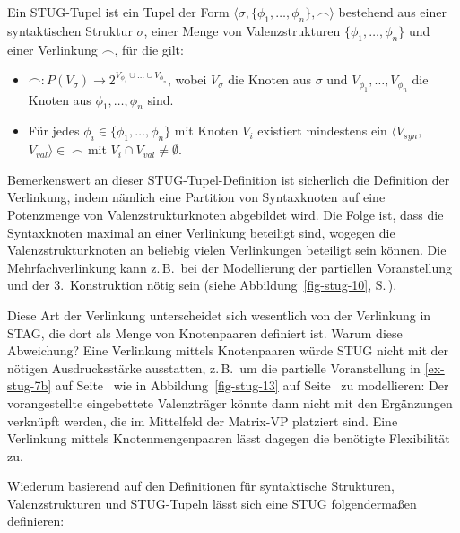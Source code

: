 \begin{definition}
Ein STUG-Tupel ist ein Tupel der Form $\langle \sigma,\{\phi_1,$\linebreak $\ldots,\phi_n\}, \frown\rangle$ bestehend aus einer syntaktischen Struktur $\sigma$, einer Menge von Valenzstrukturen $\{\phi_1,\ldots,\phi_n\}$ und einer Verlinkung $\frown$, für die gilt:
\begin{itemize}
  \item $\frown: P(V_\sigma) \to 2^{V_{\phi_1} \cup \ldots \cup V_{\phi_n}}$, wobei $V_\sigma$ die Knoten aus $\sigma$ und $V_{\phi_1}, \ldots, V_{\phi_n}$ die Knoten aus $\phi_1,\ldots,\phi_n$ sind.
  \item Für jedes $\phi_i \in \{\phi_1,\ldots,\phi_n\}$ mit Knoten $V_i$ existiert mindestens ein $\langle V_{syn},$ $V_{val}\rangle \in \ \frown$ mit $V_i \cap V_{val} \ne \emptyset$.
\end{itemize}
\end{definition}
Bemerkenswert an dieser STUG-Tupel-Definition ist sicherlich die Definition der Verlinkung, indem nämlich eine Partition von Syntaxknoten auf eine Potenzmenge von Valenzstrukturknoten abgebildet wird. Die Folge ist, dass die Syntaxknoten maximal an einer Verlinkung beteiligt sind, wogegen die Valenzstrukturknoten an beliebig vielen Verlinkungen beteiligt sein können. Die Mehrfachverlinkung kann z.\,B.\ bei der Modellierung der partiellen Voranstellung und der 3.~Konstruktion nötig sein (siehe Abbildung~\ref{fig-stug-10}, S.\,\pageref{fig-stug-10}).     

Diese Art der Verlinkung unterscheidet sich wesentlich von der Verlinkung in STAG, die dort als Menge von Knotenpaaren definiert ist. Warum diese Abweichung? Eine Verlinkung mittels Knotenpaaren würde STUG nicht mit der nötigen Ausdrucksstärke ausstatten, z.\,B.\ um die partielle Voranstellung in \ref{ex-stug-7b} auf Seite~\pageref{ex-stug-7b} wie in Abbildung~\ref{fig-stug-13} auf Seite~\pageref{fig-stug-13} zu modellieren: Der vorangestellte eingebettete Valenzträger könnte dann nicht mit den Ergänzungen verknüpft werden, die im Mittelfeld der Matrix-VP platziert sind. Eine Verlinkung mittels Knotenmengenpaaren lässt dagegen die benötigte Flexibilität zu.   

Wiederum basierend auf den Definitionen für syntaktische Strukturen, Valenzstrukturen und STUG-Tupeln lässt sich eine STUG folgenderma\ss en definieren:

